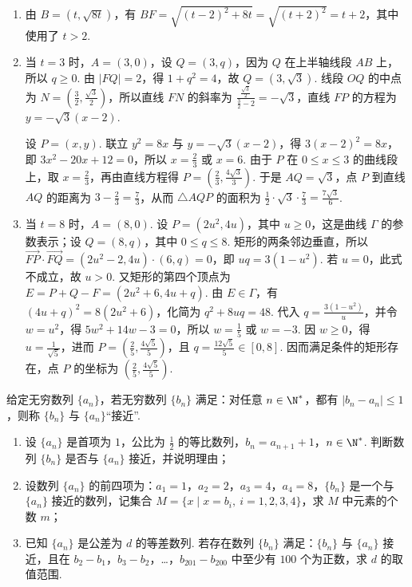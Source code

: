 \begin{solution}
\begin{enumerate}
\item 由 \(B=(t,\sqrt{8t})\)，有 \(BF=\sqrt{(t-2)^2+8t}=\sqrt{(t+2)^2}=t+2\)，其中使用了 \(t>2\).
\item 当 \(t=3\) 时，\(A=(3,0)\)，设 \(Q=(3,q)\)，因为 \(Q\) 在上半轴线段 \(AB\) 上，所以 \(q\ge0\). 由 \(\lvert FQ\rvert=2\)，得 \(1+q^2=4\)，故 \(Q=(3,\sqrt3)\). 线段 \(OQ\) 的中点为 \(N=\left(\frac32,\frac{\sqrt3}{2}\right)\)，所以直线 \(FN\) 的斜率为 \(\frac{\frac{\sqrt3}{2}}{\frac{3}{2}-2}=-\sqrt3\)，直线 \(FP\) 的方程为 \(y=-\sqrt3(x-2)\).

设 \(P=(x,y)\). 联立 \(y^2=8x\) 与 \(y=-\sqrt3(x-2)\)，得 \(3(x-2)^2=8x\)，即 \(3x^2-20x+12=0\)，所以 \(x=\frac23\) 或 \(x=6\). 由于 \(P\) 在 \(0\le x\le3\) 的曲线段上，取 \(x=\frac23\)，再由直线方程得 \(P=\left(\frac23,\frac{4\sqrt3}{3}\right)\). 于是 \(AQ=\sqrt3\)，点 \(P\) 到直线 \(AQ\) 的距离为 \(3-\frac23=\frac73\)，从而 \(\triangle AQP\) 的面积为 \(\frac12\cdot\sqrt3\cdot\frac73=\frac{7\sqrt3}{6}\).
\item 当 \(t=8\) 时，\(A=(8,0)\). 设 \(P=(2u^2,4u)\)，其中 \(u\ge0\)，这是曲线 \(\Gamma\) 的参数表示；设 \(Q=(8,q)\)，其中 \(0\le q\le8\). 矩形的两条邻边垂直，所以
\(\overrightarrow{FP}\cdot\overrightarrow{FQ}=(2u^2-2,4u)\cdot(6,q)=0\)，即 \(uq=3(1-u^2)\). 若 \(u=0\)，此式不成立，故 \(u>0\). 又矩形的第四个顶点为 \(E=P+Q-F=(2u^2+6,4u+q)\). 由 \(E\in\Gamma\)，有 \((4u+q)^2=8(2u^2+6)\)，化简为 \(q^2+8uq=48\). 代入 \(q=\frac{3(1-u^2)}{u}\)，并令 \(w=u^2\)，得 \(5w^2+14w-3=0\)，所以 \(w=\frac15\) 或 \(w=-3\). 因 \(w\ge0\)，得 \(u=\frac1{\sqrt5}\)，进而 \(P=\left(\frac25,\frac{4\sqrt5}{5}\right)\)，且 \(q=\frac{12\sqrt5}{5}\in[0,8]\). 因而满足条件的矩形存在，点 \(P\) 的坐标为 \(\left(\frac25,\frac{4\sqrt5}{5}\right)\).
\end{enumerate}
\end{solution}

\begin{problem}
给定无穷数列 \(\{a_n\}\)，若无穷数列 \(\{b_n\}\) 满足：对任意 \(n\in\N^*\)，都有 \(\lvert b_n-a_n\rvert\le1\)，则称 \(\{b_n\}\) 与 \(\{a_n\}\)“接近”.

\begin{enumerate}
\item 设 \(\{a_n\}\) 是首项为 \(1\)，公比为 \(\frac12\) 的等比数列，\(b_n=a_{n+1}+1\)，\(n\in\N^*\). 判断数列 \(\{b_n\}\) 是否与 \(\{a_n\}\) 接近，并说明理由；
\item 设数列 \(\{a_n\}\) 的前四项为：\(a_1=1\)，\(a_2=2\)，\(a_3=4\)，\(a_4=8\)，\(\{b_n\}\) 是一个与 \(\{a_n\}\) 接近的数列，记集合 \(M=\{x\mid x=b_i,\ i=1,2,3,4\}\)，求 \(M\) 中元素的个数 \(m\)；
\item 已知 \(\{a_n\}\) 是公差为 \(d\) 的等差数列. 若存在数列 \(\{b_n\}\) 满足：\(\{b_n\}\) 与 \(\{a_n\}\) 接近，且在 \(b_2-b_1\)，\(b_3-b_2\)，\ldots，\(b_{201}-b_{200}\) 中至少有 \(100\) 个为正数，求 \(d\) 的取值范围.
\end{enumerate}
\end{problem}

